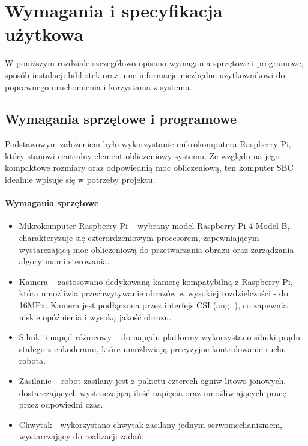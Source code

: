 \chapter{Wymagania i specyfikacja użytkowa}
\label{ch:04}

W poniższym rozdziale szczegółowo opisano wymagania sprzętowe i programowe, sposób instalacji bibliotek oraz inne informacje niezbędne użytkownikowi do poprawnego uruchomienia i korzystania z systemu. 

\section{Wymagania sprzętowe i programowe}

Podstawowym założeniem było wykorzystanie mikrokomputera Raspberry Pi, który stanowi centralny element obliczeniowy systemu. Ze względu na jego kompaktowe rozmiary oraz odpowiednią moc obliczeniową, ten komputer SBC idealnie wpisuje się w potrzeby projektu.

\subsubsection*{Wymagania sprzętowe}

\begin{itemize}
    \item Mikrokomputer Raspberry Pi – wybrany model Raspberry Pi 4 Model B, charakteryzuje się czterordzeniowym procesorem, zapewniającym wystarczającą moc obliczeniową do przetwarzania obrazu oraz zarządzania algorytmami sterowania.
    \item Kamera – zastosowano dedykowaną kamerę kompatybilną z Raspberry Pi, która umożliwia przechwytywanie obrazów w wysokiej rozdzielczości - do 16MPx. Kamera jest podłączona przez interfejs CSI (ang. ), co zapewnia niskie opóźnienia i wysoką jakość obrazu.
    \item Silniki i napęd różnicowy – do napędu platformy wykorzystano silniki prądu stałego z enkoderami, które umożliwiają precyzyjne kontrolowanie ruchu robota.
    \item Zasilanie – robot zasilany jest z pakietu czterech ogniw litowo-jonowych, dostarczających wystraczającą ilość napięcia oraz umożliwiających pracę przez odpowiedni czas.
    \item Chwytak - wykorzystano chwytak zasilany jednym serwomechanizmem, wystarczający do realizacji zadań. 
\end{itemize}

